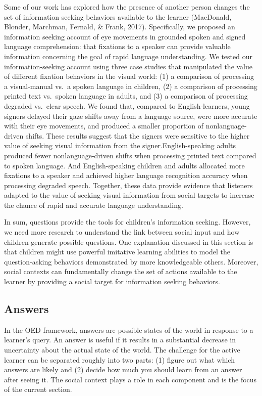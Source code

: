 \documentclass[english,floatsintext,man]{apa6}
\theoremstyle{definition}
\theoremstyle{definition}
\theoremstyle{definition}
\theoremstyle{remark}
\begin{document}
Some of our work has explored how the presence of another person changes
the set of information seeking behaviors available to the learner
(MacDonald, Blonder, Marchman, Fernald, \& Frank, 2017). Specifically,
we proposed an information seeking account of eye movements in grounded
spoken and signed language comprehension: that fixations to a speaker
can provide valuable information concerning the goal of rapid language
understanding. We tested our information-seeking account using three
case studies that manipulated the value of different fixation behaviors
in the visual world: (1) a comparison of processing a visual-manual
vs.~a spoken language in children, (2) a comparison of processing
printed text vs.~spoken language in adults, and (3) a comparison of
processing degraded vs.~clear speech. We found that, compared to
English-learners, young signers delayed their gaze shifts away from a
language source, were more accurate with their eye movements, and
produced a smaller proportion of nonlanguage-driven shifts. These
results suggest that the signers were sensitive to the higher value of
seeking visual information from the signer.English-speaking adults
produced fewer nonlanguage-driven shifts when processing printed text
compared to spoken language. And English-speaking children and adults
allocated more fixations to a speaker and achieved higher language
recognition accuracy when processing degraded speech. Together, these
data provide evidence that listeners adapted to the value of seeking
visual information from social targets to increase the chance of rapid
and accurate language understanding.

In sum, questions provide the tools for children's information seeking.
However, we need more research to understand the link between social
input and how children generate possible questions. One explanation
discussed in this section is that children might use powerful imitative
learning abilities to model the question-asking behaviors demonstrated
by more knowledgeable others. Moreover, social contexts can
fundamentally change the set of actions available to the learner by
providing a social target for information seeking behaviors.

\subsection{Answers}\label{answers}

In the OED framework, answers are possible states of the world in
response to a learner's query. An answer is useful if it results in a
substantial decrease in uncertainty about the actual state of the world.
The challenge for the active learner can be separated roughly into two
parts: (1) figure out what which answers are likely and (2) decide how
much you should learn from an answer after seeing it. The social context
plays a role in each component and is the focus of the current section.
\end{document}
